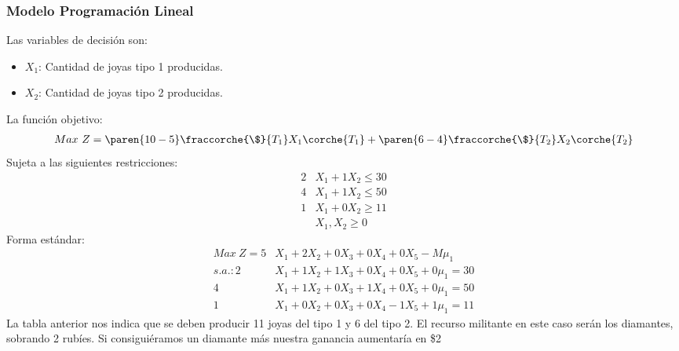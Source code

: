 

 
\begin{homeworkProblem}
\subsubsection{Modelo Programación Lineal}

Las variables de decisión son:
\begin{itemize}
    \item $X_1$: Cantidad de joyas tipo 1 producidas. \\
    \item $X_2$: Cantidad de joyas tipo 2 producidas. 
\end{itemize}
La función objetivo:
\begin{align*}
    Max\ Z = \paren{10-5}\fraccorche{\$}{T_1}X_1\corche{T_1} + \paren{6-4}\fraccorche{\$}{T_2}X_2\corche{T_2}
\end{align*}
Sujeta a las siguientes restricciones:
\begin{align*}
    2&X_1 + 1X_2 \le 30 \\
    4&X_1 + 1X_2 \le 50 \\
    1&X_1 + 0X_2 \ge 11 \\
    &X_1,X_2 \ge 0
\end{align*}
Forma estándar:
\begin{align*}
    Max\ Z = 5&X_1 + 2X_2 + 0X_3 + 0X_4 + 0X_5 - M\mu_1 \\
    s.a.: 2&X_1 + 1X_2 + 1X_3 + 0X_4 + 0X_5 + 0\mu_1 = 30 \\
          4&X_1 + 1X_2 + 0X_3 + 1X_4 + 0X_5 + 0\mu_1 = 50 \\
          1&X_1 + 0X_2 + 0X_3 + 0X_4 - 1X_5 + 1\mu_1 = 11
\end{align*}
La tabla anterior nos indica que se deben producir 11 joyas del tipo 1 y 6 del tipo 2. El recurso militante en este caso serán los diamantes, sobrando 2 rubíes. Si consiguiéramos un diamante más nuestra ganancia aumentaría en \$2

\end{homeworkProblem}
